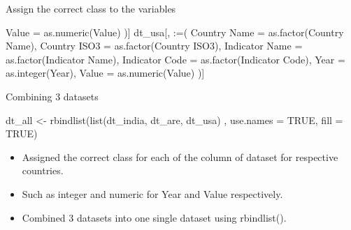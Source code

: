 \documentclass[
  8pt,
  ignorenonframetext,
]{beamer}
\newenvironment{Shaded}{\begin{snugshade}}{\end{snugshade}}
\newcommand{\AttributeTok}[1]{\textcolor[rgb]{0.40,0.45,0.13}{#1}}
\newcommand{\ConstantTok}[1]{\textcolor[rgb]{0.56,0.35,0.01}{#1}}
\newcommand{\FunctionTok}[1]{\textcolor[rgb]{0.28,0.35,0.67}{#1}}
\newcommand{\NormalTok}[1]{\textcolor[rgb]{0.00,0.23,0.31}{#1}}
\newcommand{\OtherTok}[1]{\textcolor[rgb]{0.00,0.23,0.31}{#1}}
\newcommand{\StringTok}[1]{\textcolor[rgb]{0.13,0.47,0.30}{#1}}
\providecommand{\tightlist}{%
  \setlength{\itemsep}{0pt}\setlength{\parskip}{0pt}}\usepackage{longtable,booktabs,array}
\begin{document}
\begin{frame}[fragile]{Assign the correct class to the variables}
\begin{Shaded}
\begin{Highlighting}[]
  \AttributeTok{Value =} \FunctionTok{as.numeric}\NormalTok{(Value)}
\NormalTok{)]}
\NormalTok{dt\_usa[, }\StringTok{\textasciigrave{}}\AttributeTok{:=}\StringTok{\textasciigrave{}}\NormalTok{(}
  \StringTok{\textasciigrave{}}\AttributeTok{Country Name}\StringTok{\textasciigrave{}} \OtherTok{=} \FunctionTok{as.factor}\NormalTok{(}\StringTok{\textasciigrave{}}\AttributeTok{Country Name}\StringTok{\textasciigrave{}}\NormalTok{),}
  \StringTok{\textasciigrave{}}\AttributeTok{Country ISO3}\StringTok{\textasciigrave{}} \OtherTok{=} \FunctionTok{as.factor}\NormalTok{(}\StringTok{\textasciigrave{}}\AttributeTok{Country ISO3}\StringTok{\textasciigrave{}}\NormalTok{),}
  \StringTok{\textasciigrave{}}\AttributeTok{Indicator Name}\StringTok{\textasciigrave{}} \OtherTok{=} \FunctionTok{as.factor}\NormalTok{(}\StringTok{\textasciigrave{}}\AttributeTok{Indicator Name}\StringTok{\textasciigrave{}}\NormalTok{),}
  \StringTok{\textasciigrave{}}\AttributeTok{Indicator Code}\StringTok{\textasciigrave{}} \OtherTok{=} \FunctionTok{as.factor}\NormalTok{(}\StringTok{\textasciigrave{}}\AttributeTok{Indicator Code}\StringTok{\textasciigrave{}}\NormalTok{),}
  \AttributeTok{Year =} \FunctionTok{as.integer}\NormalTok{(Year),}
  \AttributeTok{Value =} \FunctionTok{as.numeric}\NormalTok{(Value)}
\NormalTok{)]}
\end{Highlighting}
\end{Shaded}
\end{frame}

\begin{frame}[fragile]{Combining 3 datasets}
\label{combining-3-datasets}
\begin{Shaded}
\begin{Highlighting}[]
\NormalTok{dt\_all }\OtherTok{\textless{}{-}} \FunctionTok{rbindlist}\NormalTok{(}\FunctionTok{list}\NormalTok{(dt\_india, dt\_are, dt\_usa)}
\NormalTok{                    , }\AttributeTok{use.names =} \ConstantTok{TRUE}\NormalTok{, }\AttributeTok{fill =} \ConstantTok{TRUE}\NormalTok{)}
\end{Highlighting}
\end{Shaded}

\begin{itemize}
\tightlist
\item
  Assigned the correct class for each of the column of dataset for
  respective countries.
\item
  Such as integer and numeric for Year and Value respectively.
\item
  Combined 3 datasets into one single dataset using rbindlist().
\end{itemize}
\end{frame}
\end{document}
